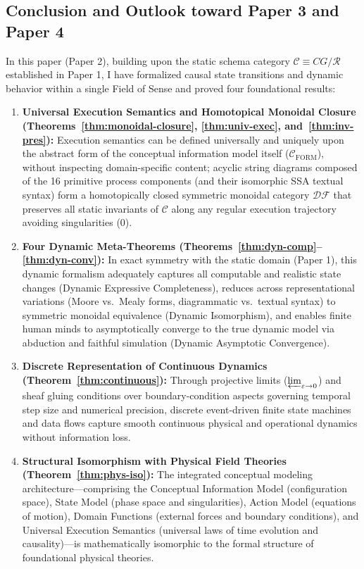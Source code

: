 \documentclass[11pt,a4paper]{article}
\theoremstyle{definition}
\theoremstyle{plain}
\theoremstyle{remark}
\newcommand{\DF}{\mathcal{DF}}
\newcommand{\Cform}{\mathcal{C}_{\mathrm{FORM}}}
\begin{document}
\subsection{Conclusion and Outlook toward Paper 3 and Paper 4}
In this paper (Paper 2), building upon the static schema category $\mathcal{C} \equiv CG/\mathcal{R}$ established in Paper 1, I have formalized causal state transitions and dynamic behavior within a single Field of Sense and proved four foundational results:
\begin{enumerate}
    \item \textbf{Universal Execution Semantics and Homotopical Monoidal Closure (Theorems~\ref{thm:monoidal-closure}, \ref{thm:univ-exec}, and~\ref{thm:inv-pres}):} Execution semantics can be defined universally and uniquely upon the abstract form of the conceptual information model itself ($\Cform$), without inspecting domain-specific content; acyclic string diagrams composed of the 16 primitive process components (and their isomorphic SSA textual syntax) form a homotopically closed symmetric monoidal category $\DF$ that preserves all static invariants of $\mathcal{C}$ along any regular execution trajectory avoiding singularities ($0$).
    \item \textbf{Four Dynamic Meta-Theorems (Theorems~\ref{thm:dyn-comp}--\ref{thm:dyn-conv}):} In exact symmetry with the static domain (Paper 1), this dynamic formalism adequately captures all computable and realistic state changes (Dynamic Expressive Completeness), reduces across representational variations (Moore vs.\ Mealy forms, diagrammatic vs.\ textual syntax) to symmetric monoidal equivalence (Dynamic Isomorphism), and enables finite human minds to asymptotically converge to the true dynamic model via abduction and faithful simulation (Dynamic Asymptotic Convergence).
    \item \textbf{Discrete Representation of Continuous Dynamics (Theorem~\ref{thm:continuous}):} Through projective limits ($\varprojlim_{\varepsilon \to 0}$) and sheaf gluing conditions over boundary-condition aspects governing temporal step size and numerical precision, discrete event-driven finite state machines and data flows capture smooth continuous physical and operational dynamics without information loss.
    \item \textbf{Structural Isomorphism with Physical Field Theories (Theorem~\ref{thm:phys-iso}):} The integrated conceptual modeling architecture---comprising the Conceptual Information Model (configuration space), State Model (phase space and singularities), Action Model (equations of motion), Domain Functions (external forces and boundary conditions), and Universal Execution Semantics (universal laws of time evolution and causality)---is mathematically isomorphic to the formal structure of foundational physical theories.
\end{enumerate}
\end{document}
